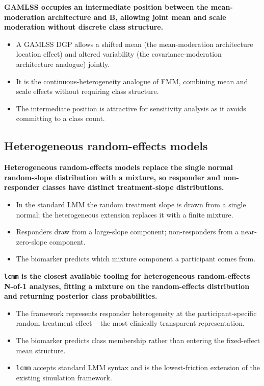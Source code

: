 \documentclass[
  11pt,
]{article}
\begin{document}
\textbf{GAMLSS occupies an intermediate position between the mean-moderation architecture
and B, allowing joint mean and scale moderation without discrete class
structure.}

\begin{itemize}\setlength{\itemsep}{2pt}\setlength{\parskip}{0pt}
\item A GAMLSS DGP allows a shifted mean (the mean-moderation architecture location
  effect) and altered variability (the covariance-moderation architecture analogue) jointly.
\item It is the continuous-heterogeneity analogue of FMM, combining
  mean and scale effects without requiring class structure.
\item The intermediate position is attractive for sensitivity analysis
  as it avoids committing to a class count.
\end{itemize}

\subsection{Heterogeneous random-effects models}\label{heterogeneous-random-effects-models}

\textbf{Heterogeneous random-effects models replace the single normal
random-slope distribution with a mixture, so responder and
non-responder classes have distinct treatment-slope distributions.}

\begin{itemize}\setlength{\itemsep}{2pt}\setlength{\parskip}{0pt}
\item In the standard LMM the random treatment slope is drawn from a
  single normal; the heterogeneous extension replaces it with a
  finite mixture.
\item Responders draw from a large-slope component; non-responders
  from a near-zero-slope component.
\item The biomarker predicts which mixture component a participant
  comes from.
\end{itemize}

\textbf{\texttt{lcmm} is the closest available tooling for
heterogeneous random-effects N-of-1 analyses, fitting a mixture on the
random-effects distribution and returning posterior class probabilities.}

\begin{itemize}\setlength{\itemsep}{2pt}\setlength{\parskip}{0pt}
\item The framework represents responder heterogeneity at the
  participant-specific random treatment effect -- the most clinically
  transparent representation.
\item The biomarker predicts class membership rather than entering
  the fixed-effect mean structure.
\item \texttt{lcmm} accepts standard LMM syntax and is the
  lowest-friction extension of the existing simulation framework.
\end{itemize}
\end{document}
